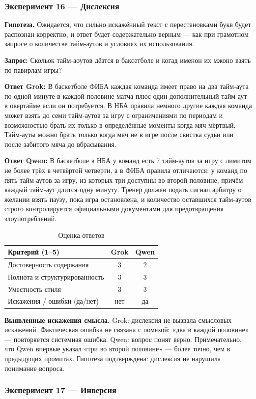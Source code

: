 \documentclass[a4paper, final]{article}
\newcommand{\scoretablefilled}[8]{%
    \vspace{4pt}
    \begin{table}[h!]
    \centering
    \small
    \begin{tabular}{|l|c|c|}
    \hline
    \textbf{Критерий (1--5)} & \textbf{Grok} & \textbf{Qwen} \\
    \hline
    Достоверность содержания & #1 & #2 \\
    \hline
    Полнота и структурированность & #3 & #4 \\
    \hline
    Уместность стиля & #5 & #6 \\
    \hline
    Искажения / ошибки (да/нет) & #7 & #8 \\
    \hline
    \end{tabular}
    \caption{Оценка ответов}
    \end{table}
    \vspace{2pt}
}
\begin{document}
\newpage

\subsubsection{Эксперимент 16 — Дислексия}

\noindent\textbf{Гипотеза.} Ожидается, что сильно искажённый текст с перестановками букв будет распознан корректно, и ответ будет содержательно верным — как при грамотном запросе о количестве тайм-аутов и условиях их использования.

\noindent\textbf{Запрос:} Скольок тайм-аоутов дёатся в баксетболе и когад именон их мжоно взять по павирлам игры?

\noindent\textbf{Ответ Grok:} В баскетболе ФИБА каждая команда имеет право на два тайм-аута по одной минуте в каждой половине матча плюс один дополнительный тайм-аут в овертайме если он потребуется. В НБА правила немного другие каждая команда может взять до семи тайм-аутов за игру с ограничениями по периодам и возможностью брать их только в определённые моменты когда мяч мёртвый. Тайм-ауты можно брать только когда мяч не в игре после свистка судьи или после забитого мяча до вбрасывания.

\noindent\textbf{Ответ Qwen:} В баскетболе в НБА у команд есть 7 тайм-аутов за игру с лимитом не более трёх в четвёртой четверти, а в ФИБА правила отличаются: у команд по пять тайм-аутов за игру, из которых три доступны во второй половине, причём каждый тайм-аут длится одну минуту. Тренер должен подать сигнал арбитру о желании взять паузу, пока игра остановлена, и количество оставшихся тайм-аутов строго контролируется официальными документами для предотвращения злоупотреблений.

\scoretablefilled{3}{2}{3}{3}{3}{3}{нет}{да}

\noindent\textbf{Выявленные искажения смысла.} Grok: дислексия не вызвала смысловых искажений. Фактическая ошибка не связана с помехой: «два в каждой половине» — повторяется системная ошибка. Qwen: вопрос понят верно. Примечательно, что Qwen впервые указал «три во второй половине» — более точно, чем в предыдущих промптах. Гипотеза подтверждена: дислексия не нарушила понимание вопроса.

\newpage

\subsubsection{Эксперимент 17 — Инверсия}
\end{document}
